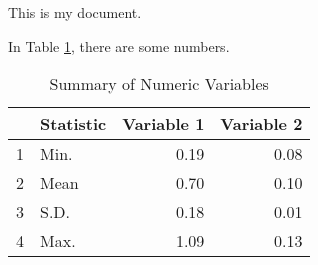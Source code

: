 \documentclass[11pt]{article}
\begin{document}
This is my document.

In Table \ref{tab:summary}, there are some numbers.

\begin{table}[ht]
\centering
\begin{tabular}{rlrr}
  \hline
 & Statistic & Variable 1 & Variable 2 \\
  \hline
  1 & Min. & 0.19 & 0.08 \\
  2 & Mean & 0.70 & 0.10 \\
  3 & S.D. & 0.18 & 0.01 \\
  4 & Max. & 1.09 & 0.13 \\
   \hline
\end{tabular}
\caption{Summary of Numeric Variables}
\label{tab:summary}
\end{table}
\end{document}
